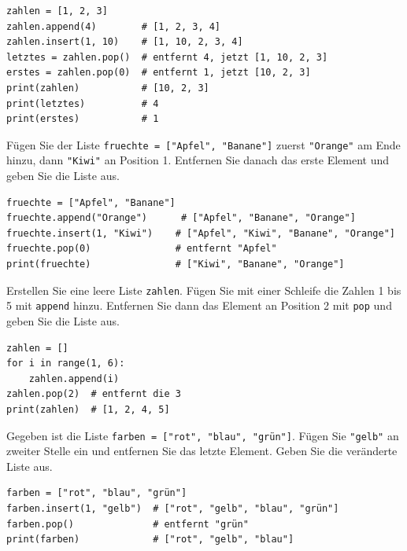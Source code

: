 \begin{myexample}
\begin{lstlisting}
zahlen = [1, 2, 3]
zahlen.append(4)        # [1, 2, 3, 4]
zahlen.insert(1, 10)    # [1, 10, 2, 3, 4]
letztes = zahlen.pop()  # entfernt 4, jetzt [1, 10, 2, 3]
erstes = zahlen.pop(0)  # entfernt 1, jetzt [10, 2, 3]
print(zahlen)           # [10, 2, 3]
print(letztes)          # 4
print(erstes)           # 1
\end{lstlisting}
\end{myexample}

\begin{myexercise}
Fügen Sie der Liste \lstinline|fruechte = ["Apfel", "Banane"]| zuerst \lstinline|"Orange"| am Ende hinzu, dann \lstinline|"Kiwi"| an Position 1. Entfernen Sie danach das erste Element und geben Sie die Liste aus.

\begin{myanswer}
\begin{lstlisting}
fruechte = ["Apfel", "Banane"]
fruechte.append("Orange")      # ["Apfel", "Banane", "Orange"]
fruechte.insert(1, "Kiwi")    # ["Apfel", "Kiwi", "Banane", "Orange"]
fruechte.pop(0)               # entfernt "Apfel"
print(fruechte)               # ["Kiwi", "Banane", "Orange"]
\end{lstlisting}
\end{myanswer}
\end{myexercise}

\begin{myexercise}
Erstellen Sie eine leere Liste \lstinline|zahlen|. Fügen Sie mit einer Schleife die Zahlen 1 bis 5 mit \lstinline|append| hinzu. Entfernen Sie dann das Element an Position 2 mit \lstinline|pop| und geben Sie die Liste aus.

\begin{myanswer}
\begin{lstlisting}
zahlen = []
for i in range(1, 6):
    zahlen.append(i)
zahlen.pop(2)  # entfernt die 3
print(zahlen)  # [1, 2, 4, 5]
\end{lstlisting}
\end{myanswer}
\end{myexercise}

\begin{myexercise}
Gegeben ist die Liste \lstinline|farben = ["rot", "blau", "grün"]|. Fügen Sie \lstinline|"gelb"| an zweiter Stelle ein und entfernen Sie das letzte Element. Geben Sie die veränderte Liste aus.

\begin{myanswer}
\begin{lstlisting}
farben = ["rot", "blau", "grün"]
farben.insert(1, "gelb")  # ["rot", "gelb", "blau", "grün"]
farben.pop()              # entfernt "grün"
print(farben)             # ["rot", "gelb", "blau"]
\end{lstlisting}
\end{myanswer}
\end{myexercise}

